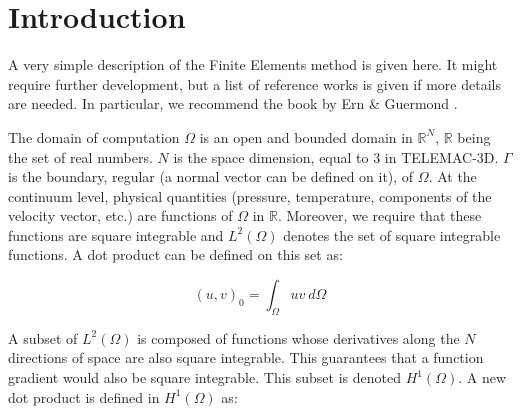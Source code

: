 \section{Introduction}

A very simple description of the Finite Elements method is given here. It might require
further development, but a list of reference works is given if more details
are needed. In particular, we recommend the book by Ern \& Guermond \cite{Ern2004}.


The domain of computation $\Omega$ is an open and bounded domain in $\mathbb{R}^{N}$,
$\mathbb{R}$ being the set of real numbers.
$N$ is the space dimension, equal to 3 in TELEMAC-3D.
$\Gamma$ is the boundary, regular (a normal vector can be defined on it),
of $\Omega$. At the continuum level, physical quantities (pressure,
temperature, components of the velocity vector, etc.) are functions of
$\Omega$ in $\mathbb{R}$. Moreover, we require that these functions are square integrable and
$L^{2}(\Omega)$ denotes the set of square integrable functions. A dot product
can be defined on this set as:%

\begin{equation}
(u,v)_{0}=\int_{\Omega}uv~d\Omega
\end{equation}


A subset of $L^{2}(\Omega)$ is composed of functions whose derivatives along
the $N$ directions of space are also square integrable. This guarantees that a
function gradient would also be square integrable. This subset is denoted
$H^{1}(\Omega)$. A new dot product is defined in $H^{1}(\Omega)$ as:%

